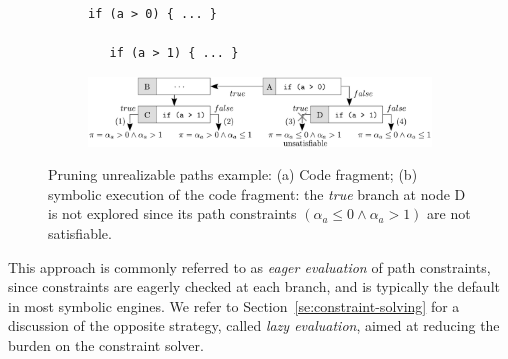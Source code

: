 \begin{figure}[t]
  \begin{subfigure}{.29\textwidth}
    \vspace{0mm}
    \begin{lstlisting}[basicstyle=\ttfamily\scriptsize]
   if (a > 0) { ... } 

   if (a > 1) { ... }
    \end{lstlisting}
    \vspace{4.99mm}
    \caption{}
  \end{subfigure}%
  \begin{subfigure}{.70\textwidth}
    \centering
    \includegraphics[width=1.0\columnwidth]{images/eager-evaluation} 
    \vspace{-6mm}
    \caption{}
  \end{subfigure}%
  \vspace{-2mm}
  \caption{Pruning unrealizable paths example: (a) Code fragment; (b) symbolic execution of the code fragment: the {\em true} branch at node D is not explored since its path constraints $(\alpha_a \leq 0 \wedge \alpha_a > 1)$ are not satisfiable.}
  \label{fig:eager-evaluation}
\end{figure}

This approach is commonly referred to as {\em eager evaluation} of path constraints, since constraints are eagerly checked at each branch, and is typically the default in most symbolic engines. We refer to Section~\ref{se:constraint-solving} for a discussion of the opposite strategy, called {\em lazy evaluation}, aimed at reducing the burden on the constraint solver.


